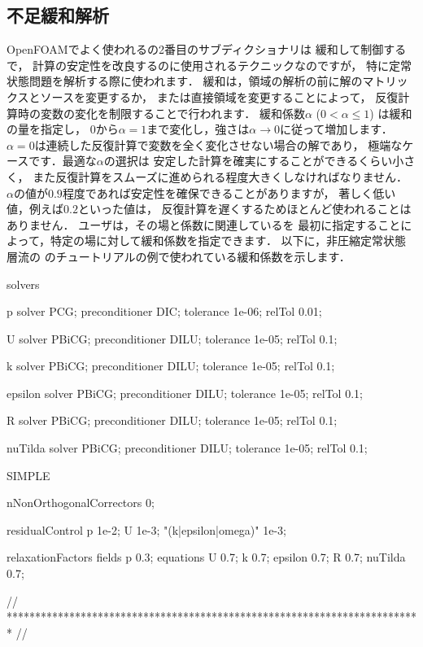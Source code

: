\subsection{不足緩和解析}
\label{ssec:4.5.2}
OpenFOAMでよく使われるの2番目のサブディクショナリは
緩和して制御するで，
計算の安定性を改良するのに使用されるテクニックなのですが，
特に定常状態問題を解析する際に使われます．
緩和は，領域の解析の前に解のマトリックスとソースを変更するか，
または直接領域を変更することによって，
反復計算時の変数の変化を制限することで行われます．
緩和係数$\alpha$ ($0 < \alpha \le 1$) は緩和の量を指定し，
$0$から$\alpha = 1$まで変化し，強さは$\alpha \to 0$に従って増加します．
$\alpha = 0$は連続した反復計算で変数を全く変化させない場合の解であり，
極端なケースです．最適な$\alpha$の選択は
安定した計算を確実にすることができるくらい小さく，
また反復計算をスムーズに進められる程度大きくしなければなりません．
$\alpha$の値が$0.9$程度であれば安定性を確保できることがありますが，
著しく低い値，例えば$0.2$といった値は，
反復計算を遅くするためほとんど使われることはありません．
ユーザは，その場と係数に関連しているを
最初に指定することによって，特定の場に対して緩和係数を指定できます．
以下に，非圧縮定常状態層流の
のチュートリアルの例で使われている緩和係数を示します．
\begin{OFverbatim}[file, linenum=17]

solvers
{
    p
    {
        solver          PCG;
        preconditioner  DIC;
        tolerance       1e-06;
        relTol          0.01;
    }

    U
    {
        solver          PBiCG;
        preconditioner  DILU;
        tolerance       1e-05;
        relTol          0.1;
    }

    k
    {
        solver          PBiCG;
        preconditioner  DILU;
        tolerance       1e-05;
        relTol          0.1;
    }

    epsilon
    {
        solver          PBiCG;
        preconditioner  DILU;
        tolerance       1e-05;
        relTol          0.1;
    }

    R
    {
        solver          PBiCG;
        preconditioner  DILU;
        tolerance       1e-05;
        relTol          0.1;
    }

    nuTilda
    {
        solver          PBiCG;
        preconditioner  DILU;
        tolerance       1e-05;
        relTol          0.1;
    }
}

SIMPLE
{
    nNonOrthogonalCorrectors 0;

    residualControl
    {
        p               1e-2;
        U               1e-3;
        "(k|epsilon|omega)" 1e-3;
    }
}

relaxationFactors
{
    fields
    {
        p               0.3;
    }
    equations
    {
        U               0.7;
        k               0.7;
        epsilon         0.7;
        R               0.7;
        nuTilda         0.7;
    }
}


// ************************************************************************* //
\end{OFverbatim}


